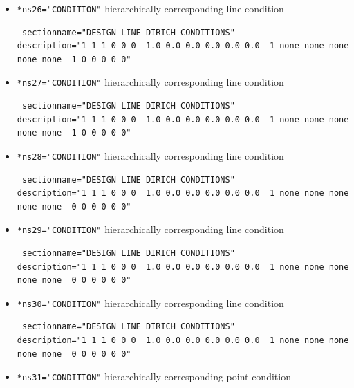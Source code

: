 \begin{itemize}
\begin{small}
\begin{verbatim}
\end{verbatim} \end{small} \item \verb|*ns26="CONDITION"| \qquad hierarchically corresponding line condition
\begin{small} \begin{verbatim} sectionname="DESIGN LINE DIRICH CONDITIONS"
description="1 1 1 0 0 0  1.0 0.0 0.0 0.0 0.0 0.0  1 none none none none none  1 0 0 0 0 0"
\end{verbatim} \end{small} \item \verb|*ns27="CONDITION"| \qquad hierarchically corresponding line condition
\begin{small} \begin{verbatim} sectionname="DESIGN LINE DIRICH CONDITIONS"
description="1 1 1 0 0 0  1.0 0.0 0.0 0.0 0.0 0.0  1 none none none none none  1 0 0 0 0 0"
\end{verbatim} \end{small} \item \verb|*ns28="CONDITION"| \qquad hierarchically corresponding line condition
\begin{small} \begin{verbatim} sectionname="DESIGN LINE DIRICH CONDITIONS"
description="1 1 1 0 0 0  1.0 0.0 0.0 0.0 0.0 0.0  1 none none none none none  0 0 0 0 0 0"
\end{verbatim} \end{small} \item \verb|*ns29="CONDITION"| \qquad hierarchically corresponding line condition
\begin{small} \begin{verbatim} sectionname="DESIGN LINE DIRICH CONDITIONS"
description="1 1 1 0 0 0  1.0 0.0 0.0 0.0 0.0 0.0  1 none none none none none  0 0 0 0 0 0"
\end{verbatim} \end{small} \item \verb|*ns30="CONDITION"| \qquad hierarchically corresponding line condition
\begin{small} \begin{verbatim} sectionname="DESIGN LINE DIRICH CONDITIONS"
description="1 1 1 0 0 0  1.0 0.0 0.0 0.0 0.0 0.0  1 none none none none none  0 0 0 0 0 0"
\end{verbatim} \end{small} \item \verb|*ns31="CONDITION"| \qquad hierarchically corresponding point condition

\end{itemize}
